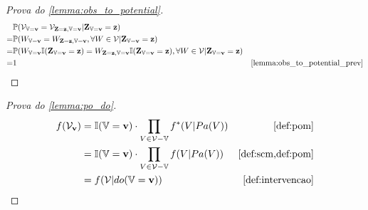 \begin{proof}[Prova do \cref{lemma:obs_to_potential}]
 \begin{align*}
  &\P(\sV_{\V=\bv} = \sV_{\Z=\bz, \V=\bv}|\Z_{\V=\bv}=\bz) \\
  =& \P(W_{\V=\bv} = W_{\Z=\bz, \V=\bv}, 
  \forall W \in \sV |\Z_{\V=\bv}=\bz) \\
  =& \P(W_{\V=\bv}\I(\Z_{\V=\bv}=\bz) 
  = W_{\Z=\bz, \V=\bv}\I(\Z_{\V=\bv}=\bz), 
  \forall W \in \sV |\Z_{\V=\bv}=\bz) \\
  =& 1 
  & \text{\cref{lemma:obs_to_potential_prev}}
 \end{align*}
\end{proof}

\begin{proof}[Prova do \cref{lemma:po_do}]
 \begin{align*}
  f(\sV_{\bv})
  &= \I(\V = \bv) \cdot \prod_{V \in \sV-\V} f^*(V|Pa(V))
  & \text{\cref{def:pom}} \\
  &= \I(\V = \bv) \cdot \prod_{V \in \sV-\V} f(V|Pa(V))
  & \text{\cref{def:scm,def:pom}} \\
  &= f(\sV|do(\V=\bv))
  & \text{\cref{def:intervencao}}
 \end{align*}
\end{proof}

